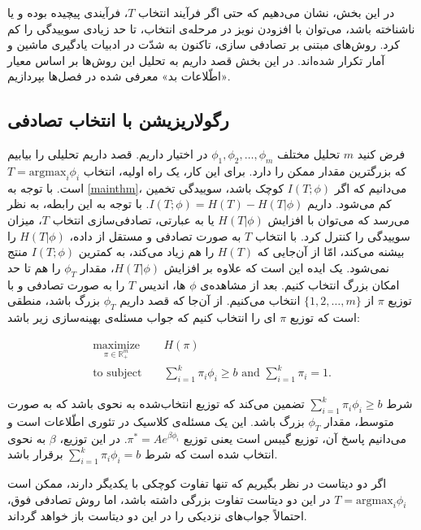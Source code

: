 \documentclass[a4paper,12pt]{article}
\begin{document}
	در این بخش، نشان می‌دهیم که حتی اگر فرآیند انتخاب 
	$T$،
	فرآیندی پیچیده بوده و یا ناشناخته باشد، می‌توان با افزودن نویز در مرحله‌ی انتخاب، تا حد زیادی سوییدگی را کم کرد. روش‌های مبتنی بر تصادفی سازی، تاکنون به شدّت در ادبیات یادگیری ماشین و آمار تکرار شده‌اند. در این بخش قصد داریم به تحلیل این روش‌ها بر اساس معیار «اطّلاعات بد» معرفی شده در فصل‌ها بپردازیم.
	
	\subsection{رگولاریزیشن با انتخاب تصادفی}
	
	فرض کنید $m$ تحلیل مختلف
	$\phi_1, \phi_2, \dots, \phi_m$
	در اختیار داریم. قصد داریم تحلیلی را بیابیم که بزرگترین مقدار ممکن را دارد. برای این کار، یک راه اولیه، انتخاب
	$T = \mathrm{argmax}_i \phi_i$
	است. با توجه به 
	\eqref{mainthm}،
	می‌دانیم که اگر 
	$I(T;\phi)$
	کوچک باشد، سوییدگی تخمین کم می‌شود. داریم
	$I(T;\phi) = H(T) - H(T|\phi)$.
	با توجه به این رابطه، به نظر می‌رسد که می‌توان با افزایش 
	$H(T|\phi)$
	یا به عبارتی، تصادفی‌سازی انتخاب 
	$T$،
	میزان سوییدگی را کنترل کرد. با انتخاب 
	$T$
	به صورت تصادفی و مستقل از داده،
	$H(T|\phi)$
	را بیشنه می‌کند، امّا از آن‌جایی که 
	$H(T)$
	را هم زیاد می‌کند، به کمترین
	$I(T;\phi)$
	منتج نمی‌شود. یک ایده این است که علاوه بر افزایش 
	$H(T|\phi)$،
	مقدار
	$\phi_T$
	را هم تا حد امکان بزرگ انتخاب کنیم. بعد از مشاهده‌ی 
	$\phi$
	ها، اندیس 
	$T$
	را به صورت تصادفی و با توزیع 
	$\pi$
	از 
	$\{1, 2, \dots, m\}$
	انتخاب می‌کنیم. از آن‌جا که قصد داریم 
	$\phi_T$
	بزرگ باشد، منطقی است که توزیع 
	$\pi$
	ای را انتخاب کنیم که جواب مسئله‌ی بهینه‌سازی زیر باشد:
	
	\begin{eqnarray*}
		\underset{{ \pi} \in \mathbb{R}^m_+}{\text{maximize}} && H({ \pi}) \\
		\text{to subject } && \sum_{i=1}^{k} \pi_i \phi_i \geq b \mbox{ and }  \sum_{i=1}^{k} \pi_i =1.
	\end{eqnarray*}
	
	شرط
	$\sum_{i = 1}^{k} \pi_i \phi_i \geq b$
	تضمین می‌کند که توزیع انتخاب‌شده به نحوی باشد که به صورت متوسط، مقدار
	$\phi_T$
	بزرگ باشد. این یک مسئله‌ی کلاسیک در تئوری اطّلاعات است و می‌دانیم پاسخ آن، توزیع گیبس است یعنی توزیع
	$\pi^* = Ae^{\beta \phi_i}$.
	در این توزیع، 
	$\beta$
	به نحوی انتخاب شده است که شرط 
	$\sum_{i=1}^{k} \pi_i \phi_i = b$
	برقرار باشد.
	
	اگر دو دیتاست در نظر بگیریم که تنها تفاوت کوچکی با یکدیگر دارند، ممکن است 
	$T = \mathrm{argmax}_i \phi_i$
	در این دو دیتاست تفاوت بزرگی داشته باشد، اما روش تصادفی فوق، احتمالاً جواب‌های نزدیکی را در این دو دیتاست باز خواهد گرداند.
	
\end{document}
